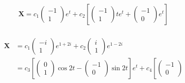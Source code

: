 \documentclass{article}
\begin{document}
\[\mathbf{X} = c_1 \begin{pmatrix}
    -1 \\
    1
  \end{pmatrix} e^t + c_2 \left[ \begin{pmatrix}
      -1 \\
      1
    \end{pmatrix} t e^t + \begin{pmatrix}
      -1 \\
      0
    \end{pmatrix} e^t \right]\]

\setcounter{subsubsection}{6}
\subsubsection{}

\begin{align*}
  \mathbf{X} & = c_1 \begin{pmatrix}
                       -i \\
                       1
                     \end{pmatrix} e^{1 + 2 i} + c_2 \begin{pmatrix}
                                                       i \\
                                                       1
                                                     \end{pmatrix} e^{1 - 2 i}                                                                                   \\
             & = c_3 \left[ \begin{pmatrix}
                                0 \\
                                1
                              \end{pmatrix} \cos 2 t - \begin{pmatrix}
                                                         -1 \\
                                                         0
                                                       \end{pmatrix} \sin 2 t \right] e^t + c_4 \left[ \begin{pmatrix}
                                                                                                         -1 \\
                                                                                                         0

\end{pmatrix}
\end{align*}
\end{document}
